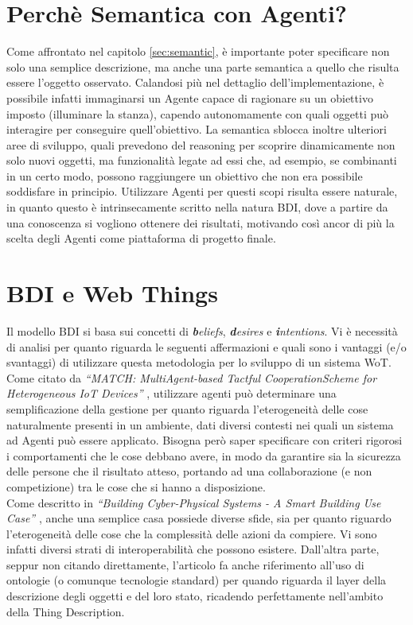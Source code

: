 \documentclass[12pt,a4paper,openright,oneside]{report}
\newcommand{\quotes}[1]{``#1''}
\begin{document}
\section{Perchè Semantica con Agenti?}
Come affrontato nel capitolo \ref{sec:semantic}, è importante poter specificare non solo una semplice descrizione, ma anche una parte semantica a quello che risulta essere l'oggetto osservato. Calandosi più nel dettaglio dell'implementazione, è possibile infatti immaginarsi un Agente capace di ragionare su un obiettivo imposto (illuminare la stanza), capendo autonomamente con quali oggetti può interagire per conseguire quell'obiettivo. La semantica sblocca inoltre ulteriori aree di sviluppo, quali prevedono del reasoning per scoprire dinamicamente non solo nuovi oggetti, ma funzionalità legate ad essi che, ad esempio, se combinanti in un certo modo, possono raggiungere un obiettivo che non era possibile soddisfare in principio. Utilizzare Agenti per questi scopi risulta essere naturale, in quanto questo è intrinsecamente scritto nella natura BDI, dove a partire da una conoscenza si vogliono ottenere dei risultati, motivando così ancor di più la scelta degli Agenti come piattaforma di progetto finale.


\section{BDI e Web Things}
Il modello BDI si basa sui concetti di \textit{\textbf{b}eliefs}, \textit{\textbf{d}esires} e \textit{\textbf{i}ntentions}. Vi è necessità di analisi per quanto riguarda le seguenti affermazioni e quali sono i vantaggi (e/o svantaggi) di utilizzare questa metodologia per lo sviluppo di un sistema WoT.\\

Come citato da \textit{\quotes{MATCH: MultiAgent-based Tactful CooperationScheme for Heterogeneous IoT Devices}} \cite{masiot}, utilizzare agenti può determinare una semplificazione della gestione per quanto riguarda l'eterogeneità delle cose naturalmente presenti in un ambiente, dati diversi contesti nei quali un sistema ad Agenti può essere applicato. Bisogna però saper specificare con criteri rigorosi i comportamenti che le cose debbano avere, in modo da garantire sia la sicurezza delle persone che il risultato atteso, portando ad una collaborazione (e non competizione) tra le cose che si hanno a disposizione.\\

Come descritto in \textit{\quotes{Building Cyber-Physical Systems - A Smart Building Use Case}} \cite{smartbuilding}, anche una semplice casa possiede diverse sfide, sia per quanto riguardo l'eterogeneità delle cose che la complessità delle azioni da compiere. Vi sono infatti diversi strati di interoperabilità che possono esistere. Dall'altra parte, seppur non citando direttamente, l'articolo fa anche riferimento all'uso di ontologie (o comunque tecnologie standard) per quando riguarda il layer della descrizione degli oggetti e del loro stato, ricadendo perfettamente nell'ambito della Thing Description.\\
\end{document}
